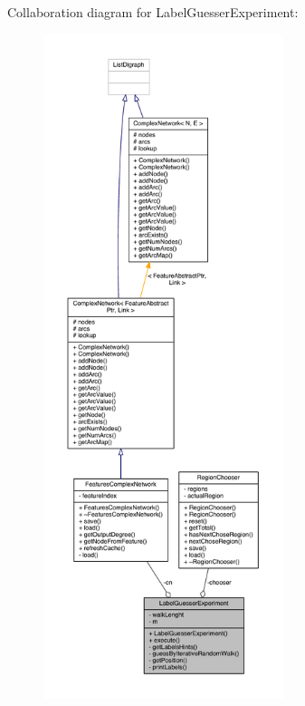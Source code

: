 Collaboration diagram for Label\+Guesser\+Experiment\+:
\nopagebreak
\begin{figure}[H]
\begin{center}
\leavevmode
\includegraphics[height=550pt]{class_label_guesser_experiment__coll__graph}
\end{center}
\end{figure}


